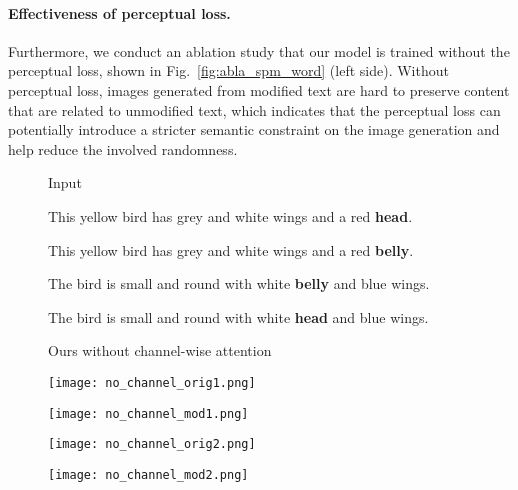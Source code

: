\documentclass{article}
\begin{document}
\paragraph{Effectiveness of perceptual loss.} Furthermore, we conduct an ablation study that our model is trained without the perceptual loss, shown in Fig.~\ref{fig:abla_spm_word} (left side).
Without perceptual loss, images generated from modified text are hard to preserve content that are related to unmodified text, which indicates that the perceptual loss can potentially introduce a stricter semantic constraint on the image generation and help reduce the involved randomness. 

\begin{figure}[t]
\begin{minipage}{0.48\textwidth}
\begin{minipage}{0.184\textwidth}
\centering
\tiny{Input}
\end{minipage}
\begin{minipage}{0.184\textwidth}
\centering
\tiny{This yellow bird has grey and white wings and a red \textbf{head}.}
\end{minipage}
\noindent\begin{minipage}{0.184\textwidth}
\centering
\tiny{This yellow bird has grey and white wings and a red \textbf{belly}.}
\end{minipage}
\noindent\begin{minipage}{0.184\textwidth}
\centering
\tiny{The bird is small and round with white \textbf{belly} and blue wings.}
\end{minipage}
\noindent\begin{minipage}{0.184\textwidth}
\centering
\tiny{The bird is small and round with white \textbf{head} and blue wings.}
\end{minipage}
\smallskip

\begin{minipage}{0.184\textwidth}
\centering
\tiny{Ours without channel-wise attention}
\end{minipage}
\begin{minipage}{0.184\textwidth}
\texttt{[image: no\_channel\_orig1.png]}
\end{minipage}
\noindent\begin{minipage}{0.184\textwidth}
\texttt{[image: no\_channel\_mod1.png]}
\end{minipage}
\noindent\begin{minipage}{0.184\textwidth}
\texttt{[image: no\_channel\_orig2.png]}
\end{minipage}
\noindent\begin{minipage}{0.184\textwidth}
\texttt{[image: no\_channel\_mod2.png]}
\end{minipage}


\end{minipage}
\end{figure}
\end{document}
